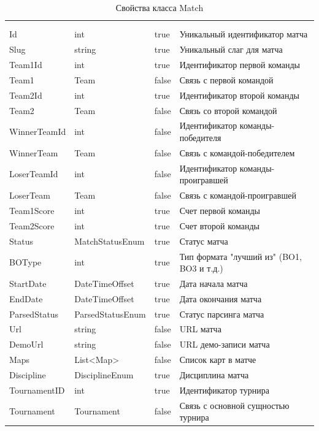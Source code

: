 \begin{xltabular}{\textwidth}{|X|X|X|X|}
	\caption{Свойства класса Match}\label{table:Match}\\ \hline
	 &  &  &  \\ \hline
	 &  &  &  \\ \hline
	\endfirsthead
	 \hline
	 &  &  &  \\ \hline
	\endhead
	Id & int & true & Уникальный идентификатор матча \\ \hline
	Slug & string & true & Уникальный слаг для матча \\ \hline
	Team1Id & int & true & Идентификатор первой команды \\ \hline
	Team1 & Team & false & Связь с первой командой \\ \hline
	Team2Id & int & true & Идентификатор второй команды \\ \hline
	Team2 & Team & false & Связь со второй командой \\ \hline
	WinnerTeamId & int & false & Идентификатор команды-победителя \\ \hline
	WinnerTeam & Team & false & Связь с командой-победителем \\ \hline
	LoserTeamId & int & false & Идентификатор команды-проигравшей \\ \hline
	LoserTeam & Team & false & Связь с командой-проигравшей \\ \hline
	Team1Score & int & true & Счет первой команды \\ \hline
	Team2Score & int & true & Счет второй команды \\ \hline
	Status & MatchStatusEnum & true & Статус матча \\ \hline
	BOType & int & true & Тип формата "лучший из" (BO1, BO3 и т.д.) \\ \hline
	StartDate & DateTimeOffset & true & Дата начала матча \\ \hline
	EndDate & DateTimeOffset & true & Дата окончания матча \\ \hline
	ParsedStatus & ParsedStatusEnum & true & Статус парсинга матча \\ \hline
	Url & string & false & URL матча \\ \hline
	DemoUrl & string & false & URL демо-записи матча \\ \hline
	Maps & List<Map> & false & Список карт в матче \\ \hline
	Discipline & DisciplineEnum & true & Дисциплина матча \\ \hline
	TournamentID & int & true & Идентификатор турнира \\ \hline
	Tournament & Tournament & false & Связь с основной сущностью турнира \\ \hline
\end{xltabular}

